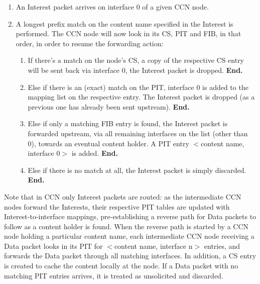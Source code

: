 \begin{enumerate}

    \item An Interest packet arrives on interface 0 of a given CCN node.
    \item A longest prefix match on the content name specified in the Interest 
        is performed. The CCN node will now look in its CS, PIT and FIB, in 
        that order, in order to resume the forwarding action:
        \begin{enumerate}

            \item If there's a match on the node's CS, a copy of the respective 
                CS entry will be sent back via interface 0, the Interest 
                packet is dropped. \textbf{End.}

            \item Else if there is an (exact) match on the PIT, interface 0 is 
                added to the mapping list on the respective entry. The 
                Interest packet is dropped (as a previous one has already been 
                sent upstream). \textbf{End.}

            \item Else if only a matching FIB entry is found, the Interest 
                packet is forwarded upstream, via all remaining interfaces on the 
                list (other than 0), towards an eventual content holder. A PIT 
                entry $<$content name, interface 0$>$ is added. \textbf{End.}

            \item Else if there is no match at all, the Interest packet is 
                simply discarded. \textbf{End.}

        \end{enumerate}

\end{enumerate}

Note that in CCN 
only Interest packets are routed: as the intermediate CCN nodes forward the 
Interests, their respective PIT tables are updated with Interest-to-interface 
mappings, pre-establishing a reverse path for Data packets to follow as a 
content holder is found. When the reverse path is started by a CCN node 
holding a particular content name, each intermediate CCN node receiving a 
Data packet looks in its PIT for $<$content name, interface n$>$ entries, 
and forwards the Data packet through all matching interfaces. In addition, a 
CS entry is created to cache the content locally at the node. If a Data packet 
with no matching PIT entries arrives, it is treated as unsolicited and discarded.
